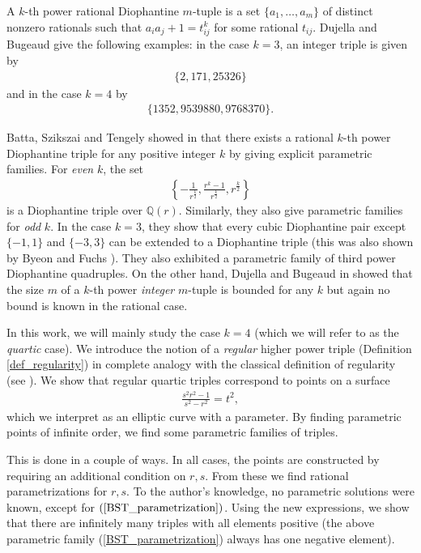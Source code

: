 \documentclass{amsart}
\begin{document}
A $k$-th power rational Diophantine $m$-tuple is a set $\{a_1,\ldots,a_m\}$ of distinct nonzero rationals such that $a_ia_j+1 = t_{ij}^k$ for some rational $t_{ij}$. Dujella and Bugeaud \cite{bugeaud2003problem} give the following examples: in the case $k=3$, an integer triple is given by
\begin{align*}
    \{2,171,25326\}
\end{align*}
and in the case $k=4$ by
\begin{align*}
    \{1352, 9539880, 9768370\}.
\end{align*}

Batta, Szikszai and Tengely showed in \cite{batta2025higher} that there exists a rational $k$-th power Diophantine triple for any positive integer $k$ by giving explicit parametric families. For \emph{even} $k$, the set
\begin{align} \label{BST_parametrization}
\left\{    -\frac{1}{r^{\frac{k}{2}}},\frac{r^k-1}{r^{\frac{k}{2}}}, r^\frac{k}{2} \right\}
\end{align}
is a Diophantine triple over $\mathbb{Q}(r)$. Similarly, they also give parametric families for \emph{odd} $k$. In the case $k=3$, they show that every cubic Diophantine pair except $\{-1,1\}$ and $\{-3,3\}$ can be extended to a Diophantine triple (this was also shown by Byeon and Fuchs \cite{byeon2026cube}). They also exhibited a parametric family of third power Diophantine quadruples. On the other hand, Dujella and Bugeaud in \cite{bugeaud2003problem} showed that the size $m$ of a $k$-th power \emph{integer} $m$-tuple is bounded for any $k$ but again no bound is known in the rational case.

In this work, we will mainly study the case $k=4$ (which we will refer to as the \emph{quartic} case). We introduce the notion of a \emph{regular} higher power triple (Definition \ref{def_regularity}) in complete analogy with the classical definition of regularity (see \cite{dujella2024diophantine}). We show that regular quartic triples correspond to points on a surface
\begin{align*}
    \frac{s^2r^2-1}{s^2-r^2}=t^2,
\end{align*}
which we interpret as an elliptic curve with a parameter. By finding parametric points of infinite order, we find some parametric families of triples.

This is done in a couple of ways. In all cases, the points are constructed by requiring an additional condition on $r,s$. From these we find rational parametrizations for $r,s$. To the author's knowledge, no parametric solutions were known, except for $(\ref{BST_parametrization})$. Using the new expressions, we show that there are infinitely many triples with all elements positive (the above parametric family (\ref{BST_parametrization}) always has one negative element). 
\end{document}
